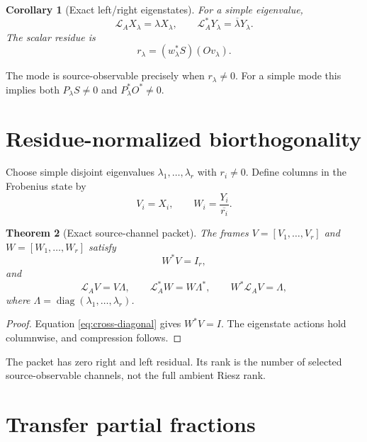 \documentclass[12pt]{article}
\newtheorem{theorem}{Theorem}[section]
\newtheorem{corollary}[theorem]{Corollary}
\theoremstyle{remark}
\newcommand{\cL}{\mathcal L}
\begin{document}
\begin{corollary}[Exact left/right eigenstates]\label{cor:eigenstates}
For a simple eigenvalue,
\begin{equation}\label{eq:eigenstate-actions}
 \cL_AX_\lambda=\lambda X_\lambda,
 \qquad
 \cL_A^*Y_\lambda=\overline\lambda Y_\lambda.
\end{equation}
The scalar residue is
\begin{equation}\label{eq:simple-residue}
 r_\lambda=(w_\lambda^*S)(Ov_\lambda).
\end{equation}
\end{corollary}

The mode is source-observable precisely when $r_\lambda\ne0$.  For a simple
mode this implies both $P_\lambda S\ne0$ and
$P_\lambda^*O^*\ne0$.

\section{Residue-normalized biorthogonality}

Choose simple disjoint eigenvalues $\lambda_1,\ldots,\lambda_r$ with
$r_i\ne0$.  Define columns in the Frobenius state by
\begin{equation}\label{eq:raw-frames}
 V_i=X_i,
 \qquad
 W_i=\frac{Y_i}{\overline{r_i}}.
\end{equation}

\begin{theorem}[Exact source-channel packet]\label{thm:packet}
The frames $V=[V_1,\ldots,V_r]$ and $W=[W_1,\ldots,W_r]$ satisfy
\begin{equation}\label{eq:biorthogonality}
 W^*V=I_r,
\end{equation}
and
\begin{equation}\label{eq:exact-compression}
 \cL_AV=V\Lambda,
 \qquad
 \cL_A^*W=W\Lambda^*,
 \qquad
 W^*\cL_AV=\Lambda,
\end{equation}
where $\Lambda=\operatorname{diag}(\lambda_1,\ldots,\lambda_r)$.
\end{theorem}

\begin{proof}
Equation \eqref{eq:cross-diagonal} gives $W^*V=I$.  The eigenstate actions
hold columnwise, and compression follows.
\end{proof}

The packet has zero right and left residual.  Its rank is the number of
selected source-observable channels, not the full ambient Riesz rank.

\section{Transfer partial fractions}
\end{document}
